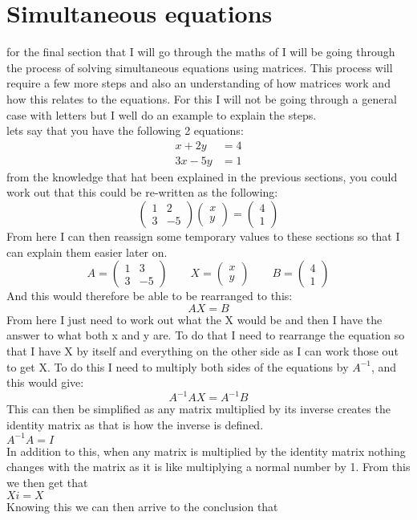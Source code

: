 \documentclass{article}
\begin{document}
\section{Simultaneous equations}
for the final section that I will go through the maths of I will be going through the process of solving simultaneous equations using matrices. This process will require a few more steps and also an understanding of how matrices work and how this relates to the equations. For this I will not be going through a general case with letters but I well do an example to explain the steps.   
\\
lets say that you have the following 2 equations:
\begin{align*}
	x+2y &=4\\
	3x-5y &=1
\end{align*}
from the knowledge that hat been explained in the previous sections, you could work out that this could be re-written as the following:
\[
	\begin{pmatrix}
		1 & 2\\
		3 & -5
	\end{pmatrix}
	\begin{pmatrix}
		x\\
		y
	\end{pmatrix}
	=
	\begin{pmatrix}
		4\\
		1
	\end{pmatrix}
\]
From here I can then reassign some temporary values to these sections so that I can explain them easier later on. 
\[
	A =
	\begin{pmatrix}
		1 & 3\\
		3 & -5
	\end{pmatrix}
	\qquad
	X =
	\begin{pmatrix}
		x\\
		y
	\end{pmatrix}
	\qquad
	B =
	\begin{pmatrix}
		4\\
		1
	\end{pmatrix}
\]
And this would therefore be able to be rearranged to this:
\[
	AX = B
\]
From here I just need to work out what the X would be and then I have the answer to what both x and y are. To do that I need to rearrange the equation so that I have X by itself and everything on the other side as I can work those out to get X. To do this I need to multiply both sides of the equations by $A^{-1}$, and this would give:
\[
	A^{-1}AX = A^{-1}B
\]
This can then be simplified as any matrix multiplied by its inverse creates the identity matrix as that is how the inverse is defined. \\ $A^{-1}A = I$ \\ In addition to this, when any matrix is multiplied by the identity matrix nothing changes with the matrix as it is like multiplying a normal number by 1. From this we then get that \\ $Xi = X$ \\ Knowing this we can then arrive to the conclusion that 
\end{document}

